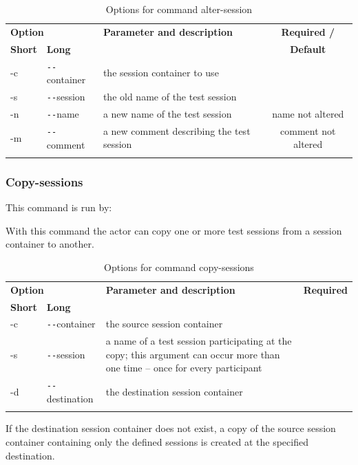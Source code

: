 \begin{longtable}{|l|l|p{73mm}|c|}\hline
   \multicolumn{2}{|l|}{\textbf{Option}} & 
   {\textbf{Parameter and description}} & 
   {\textbf{Required /}} \\
   {\textbf{Short}} &
   {\textbf{Long}} &
    & 
   {\textbf{Default}} \\\hline \hline \endhead
   -c & \verb$--$container & the session container to use & \x \\\hline
   -s & \verb$--$session & the old name of the test session & \x \\\hline
   -n & \verb$--$name & a new name of the test session & name not altered \\\hline
   -m & \verb$--$comment & a new comment describing the test session & comment not altered \\\hline
  \caption{Options for command alter-session}
  \label{fr_tb:Options for command alter-session}
\end{longtable}

\subsubsection{Copy-sessions}
This command is run by:
\begin{quote}
\end{quote}
\par
With this command the actor can copy one or more test sessions from a session container to another.

\begin{longtable}{|l|l|p{73mm}|c|}\hline
   \multicolumn{2}{|l|}{\textbf{Option}} & 
   {\textbf{Parameter and description}} & 
   {\textbf{Required}} \\
   {\textbf{Short}} &
   {\textbf{Long}} &
    & 
   \\\hline \hline \endhead
   -c & \verb$--$container & the source session container & \x \\\hline
   -s & \verb$--$session & a name of a test session participating at the copy; this argument can occur more than one time -- once for every participant & \x \\\hline
   -d & \verb$--$destination & the destination session container & \x \\\hline
  \caption{Options for command copy-sessions}
  \label{fr_tb:Options for command copy-sessions}
\end{longtable}
\par
If the destination session container does not exist, a copy of the source session container containing only the defined sessions is created at the specified destination.

